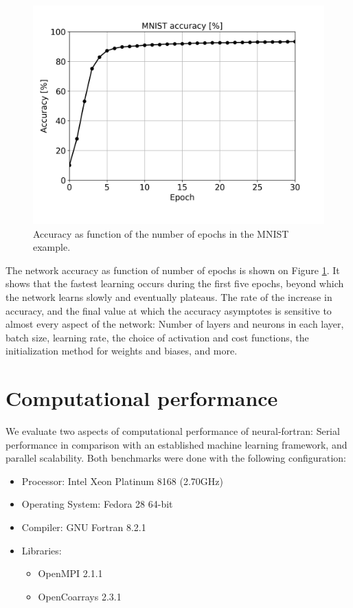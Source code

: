 \documentclass[sigplan, review=false, screen=true, balance=true]{acmart}
\begin{document}
\begin{figure}[H]
  \centering
  \includegraphics[width=\columnwidth]{../figures/mnist_accuracy.png}
  \caption{Accuracy as function of the number of epochs in the MNIST example.}
  \label{fig_mnist_accuracy}
\end{figure}

The network accuracy as function of number of epochs is shown on Figure
\ref{fig_mnist_accuracy}. It shows that the fastest learning occurs during
the first five epochs, beyond which the network learns slowly and eventually
plateaus.
The rate of the increase in accuracy, and the final value at which the accuracy
asymptotes is sensitive to almost every aspect of the network:
Number of layers and neurons in each layer, batch size,
learning rate, the choice of activation and cost functions, the initialization
method for weights and biases, and more.

\section{Computational performance} \label{section_performance}

We evaluate two aspects of computational performance of neural-fortran:
Serial performance in comparison with an established machine learning framework,
and parallel scalability. Both benchmarks were done with the following
configuration:

\begin{itemize}
  \item Processor: Intel Xeon Platinum 8168 (2.70GHz)
  \item Operating System: Fedora 28 64-bit
  \item Compiler: GNU Fortran 8.2.1
  \item Libraries:
  \begin{itemize}
    \item OpenMPI 2.1.1
    \item OpenCoarrays 2.3.1 \citep{fanfarillo14}
  \end{itemize}
\end{itemize}
\end{document}
